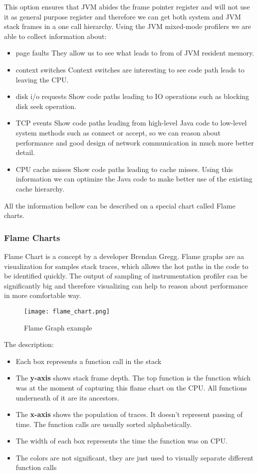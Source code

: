 This option ensures that JVM abides the frame pointer register and will not use it as general purpose register and therefore we can get both system and JVM stack frames in a one call hierarchy. Using the JVM mixed-mode profilers we are able to collect information about:
\begin{itemize}
	\item page faults
	They allow us to see what leads to from of JVM resident memory.
	\item context switches
	Context switches are interesting to see code path leads to leaving the CPU.
	\item disk i/o requests
	Show code paths leading to IO operations such as blocking disk seek operation.
	\item TCP events
	Show code paths leading from high-level Java code to low-level system methods such as connect or accept, so we can reason about performance and good design of network communication in much more better detail.
	\item CPU cache misses
	Show code paths leading to cache misses. Using this information we can optimize the Java code to make better use of the existing cache hierarchy.
\end{itemize}

All the information bellow can be described on a special chart called Flame charts.
\subsubsection{Flame Charts}
Flame Chart is a concept by a developer Brendan Gregg. Flame graphs are aa visualization for samples stack traces, which allows the hot paths in the code to be identified quickly. The output of sampling of instrumentation profiler can be significantly big and therefore visualizing can help to reason about performance in more comfortable way. 

\begin{figure}
	\centering
	\texttt{[image: flame\_chart.png]}
	\caption{Flame Graph example}
	\label{fig:flame_chart}
\end{figure}
The description:
\begin{itemize}
	\item Each box represents a function call in the stack
	\item The \textbf{y-axis} shows stack frame depth. The top function is the function which was at the moment of capturing this flame chart on the CPU. All functions underneath of it are its ancestors.
	\item The \textbf{x-axis} shows the population of traces. It doesn't represent passing of time. The function calls are usually sorted alphabetically.
	\item The width of each box represents the time the function was on CPU.
	\item The colors are not significant, they are just used to visually separate different function calls
\end{itemize}

